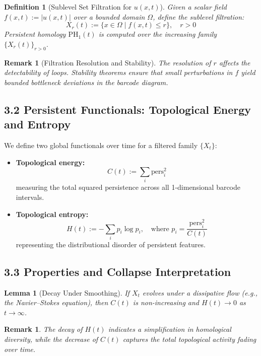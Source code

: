 \documentclass[11pt]{article}
\newtheorem{definition}[theorem]{Definition}
\newtheorem{remark}[theorem]{Remark}
\newtheorem{lemma}[theorem]{Lemma}
\begin{document}
\begin{definition}[Sublevel Set Filtration for $u(x,t)$]
Given a scalar field $f(x,t) := |u(x,t)|$ over a bounded domain $\Omega$, define the sublevel filtration:
\[
X_r(t) := \{ x \in \Omega \mid f(x,t) \leq r \}, \quad r > 0
\]
Persistent homology $\mathrm{PH}_1(t)$ is computed over the increasing family $\{ X_r(t) \}_{r > 0}$.
\end{definition}

\begin{remark}[Filtration Resolution and Stability]
The resolution of $r$ affects the detectability of loops. Stability theorems ensure that small perturbations in $f$ yield bounded bottleneck deviations in the barcode diagram.
\end{remark}

\subsection{3.2 Persistent Functionals: Topological Energy and Entropy}

We define two global functionals over time for a filtered family $\{X_t\}$:
\begin{itemize}
  \item \textbf{Topological energy:} 
  \[
  C(t) := \sum_i \mathrm{pers}_i^2
  \]
  measuring the total squared persistence across all 1-dimensional barcode intervals.
  
  \item \textbf{Topological entropy:}
  \[
  H(t) := -\sum_i p_i \log p_i, \quad \text{where } p_i = \frac{\mathrm{pers}_i^2}{C(t)}
  \]
  representing the distributional disorder of persistent features.
\end{itemize}

\subsection{3.3 Properties and Collapse Interpretation}

\begin{lemma}[Decay Under Smoothing]
If $X_t$ evolves under a dissipative flow (e.g., the Navier--Stokes equation), then $C(t)$ is non-increasing and $H(t) \to 0$ as $t \to \infty$.
\end{lemma}

\begin{remark}
The decay of $H(t)$ indicates a simplification in homological diversity, while the decrease of $C(t)$ captures the total topological activity fading over time.
\end{remark}
\end{document}

